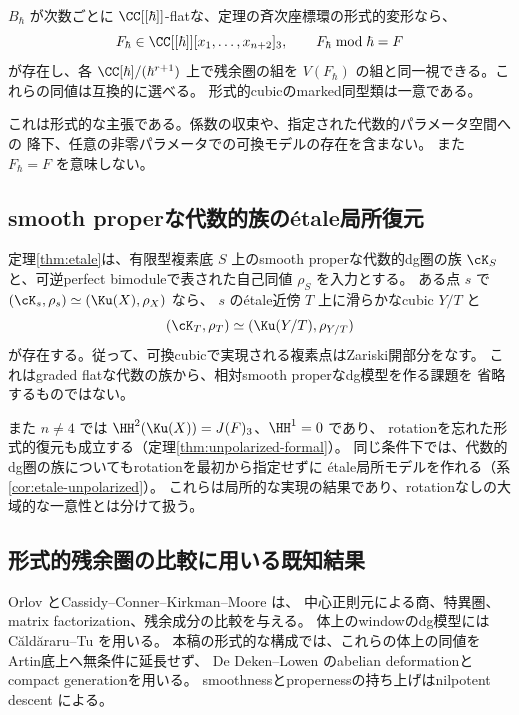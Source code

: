 \begin{corollary}[形式族]\label{cor:formal}
 \(B_\hbar\) が次数ごとに \(\CC[[\hbar]]\)-flatな、定理の斉次座標環の形式的変形なら、
 \[
 F_\hbar\in\CC[[\hbar]][x_1,\ldots,x_{n+2}]_3,\qquad F_\hbar\bmod\hbar=F
 \]
 が存在し、各 \(\CC[\hbar]/(\hbar^{r+1})\) 上で残余圏の組を
 \(V(F_\hbar)\) の組と同一視できる。これらの同値は互換的に選べる。
 形式的cubicのmarked同型類は一意である。
\end{corollary}

これは形式的な主張である。係数の収束や、指定された代数的パラメータ空間への
降下、任意の非零パラメータでの可換モデルの存在を含まない。
また \(F_\hbar=F\) を意味しない。

\subsection{smooth properな代数的族のétale局所復元}

定理\ref{thm:etale}は、有限型複素底 \(S\) 上のsmooth properな代数的dg圏の族
\(\cK_S\) と、可逆perfect bimoduleで表された自己同値 \(\rho_S\) を入力とする。
ある点 \(s\) で \((\cK_s,\rho_s)\simeq(\Ku(X),\rho_X)\) なら、
\(s\) のétale近傍 \(T\) 上に滑らかなcubic \(Y/T\) と
\[
 (\cK_T,\rho_T)\simeq(\Ku(Y/T),\rho_{Y/T})
\]
が存在する。従って、可換cubicで実現される複素点はZariski開部分をなす。
これはgraded flatな代数の族から、相対smooth properなdg模型を作る課題を
省略するものではない。

また \(n\ne4\) では \(\HH^2(\Ku(X))=J(F)_3\)、\(\HH^1=0\) であり、
rotationを忘れた形式的復元も成立する（定理\ref{thm:unpolarized-formal}）。
同じ条件下では、代数的dg圏の族についてもrotationを最初から指定せずに
étale局所モデルを作れる（系\ref{cor:etale-unpolarized}）。
これらは局所的な実現の結果であり、rotationなしの大域的な一意性とは分けて扱う。

\subsection{形式的残余圏の比較に用いる既知結果}

Orlov \cite{Orlov} とCassidy--Conner--Kirkman--Moore \cite{CCKM} は、
中心正則元による商、特異圏、matrix factorization、残余成分の比較を与える。
体上のwindowのdg模型にはCăldăraru--Tu \cite[Theorem 5.8]{CT} を用いる。
本稿の形式的な構成では、これらの体上の同値をArtin底上へ無条件に延長せず、
De Deken--Lowen \cite{DDL} のabelian deformationとcompact generationを用いる。
smoothnessとpropernessの持ち上げはnilpotent descent
\cite{Mathew}による。


